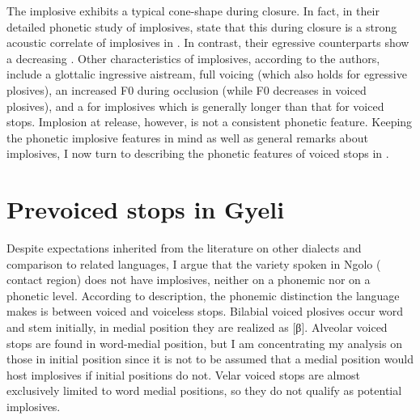 \documentclass[output=paper]{LSP/langsci}
\begin{document}

The implosive exhibits a typical cone-shape  during closure. In fact, \citet{Nagano2012} in their detailed phonetic study of  implosives, state that this  during closure is a strong acoustic correlate of implosives in . In contrast, their egressive counterparts show a decreasing . Other characteristics of  implosives, according to the authors, include a glottalic ingressive aistream, full voicing (which also holds for egressive plosives), an increased F0 during occlusion (while F0 decreases in voiced plosives), and a  for implosives which is generally longer than that for voiced stops. Implosion at release, however, is not a consistent phonetic feature. Keeping the phonetic  implosive features in mind as well as  general remarks about  implosives, I now turn to describing the phonetic features of voiced stops in . 









\section{Prevoiced stops in Gyeli}
\label{sec:grimm:3}

Despite expectations inherited from the literature on other  dialects and comparison to related languages, I argue that the  variety spoken in Ngolo ( contact region) does not have implosives, neither on a phonemic nor on a phonetic level. According to  description, the phonemic distinction the language makes is between voiced and voiceless stops. Bilabial voiced plosives occur word and stem initially, in medial position they are realized as [β]. Alveolar voiced stops are found in word-medial position, but I am concentrating my analysis on those in initial position since it is not to be assumed that a medial position would host implosives if initial positions do not. Velar voiced stops are almost exclusively limited to word medial positions, so they do not qualify as potential implosives.
\end{document}
